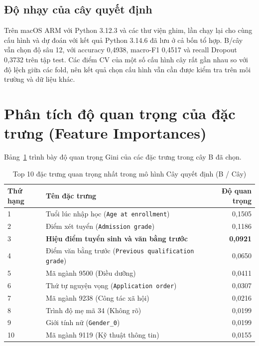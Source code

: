 \subsection{Độ nhạy của cây quyết định}\label{sec:tree-sensitivity}
Trên macOS ARM với Python 3.12.3 và các thư viện ghim, lần chạy lại cho cùng cấu hình và dự đoán với kết quả Python 3.14.6 đã lưu ở cả bốn tổ hợp. B/cây vẫn chọn độ sâu 12, với accuracy 0,4938, macro-F1 0,4517 và recall Dropout 0,3732 trên tập test. Các điểm CV của một số cấu hình cây rất gần nhau so với độ lệch giữa các fold, nên kết quả chọn cấu hình vẫn cần được kiểm tra trên môi trường và dữ liệu khác.

\section{Phân tích độ quan trọng của đặc trưng (Feature Importances)}
Bảng~\ref{tab:feature-importance} trình bày độ quan trọng Gini của các đặc trưng trong cây B đã chọn.

\begin{table}[H]\centering\small
\caption{Top 10 đặc trưng quan trọng nhất trong mô hình Cây quyết định (B / Cây)}\label{tab:feature-importance}
\begin{tabular}{p{1.7cm}p{8.0cm}r}\toprule
Thứ hạng & Tên đặc trưng & Độ quan trọng\\\midrule
1 & Tuổi lúc nhập học (\texttt{Age at enrollment}) & 0,1505\\
2 & Điểm xét tuyển (\texttt{Admission grade}) & 0,1186\\
3 & \textbf{Hiệu điểm tuyển sinh và văn bằng trước} & \textbf{0,0921}\\
4 & Điểm văn bằng trước (\texttt{Previous qualification grade}) & 0,0650\\
5 & Mã ngành 9500 (Điều dưỡng) & 0,0411\\
6 & Thứ tự nguyện vọng (\texttt{Application order}) & 0,0307\\
7 & Mã ngành 9238 (Công tác xã hội) & 0,0216\\
8 & Trình độ mẹ mã 34 (Không rõ) & 0,0199\\
9 & Giới tính nữ (\texttt{Gender\_0}) & 0,0199\\
10 & Mã ngành 9119 (Kỹ thuật thông tin) & 0,0155\\
\bottomrule\end{tabular}
\end{table}

